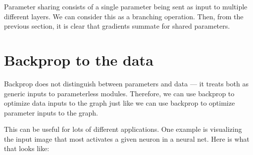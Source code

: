 Parameter sharing consists of a single parameter being sent as input to multiple different layers. We can consider this as a branching operation. Then, from the previous section, it is clear that gradients summate for shared parameters.

\section{Backprop to the data}

Backprop does not distinguish between parameters and data — it treats both as generic inputs to parameterless modules. Therefore, we can use backprop to optimize data inputs to the graph just like we can use backprop to optimize parameter inputs to the graph.

This can be useful for lots of different applications. One example is visualizing the input image that most activates a given neuron in a neural net. Here is what that looks like:

